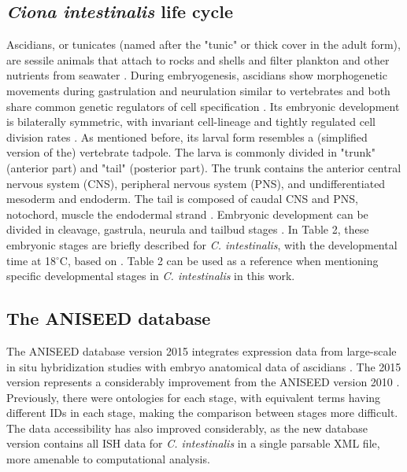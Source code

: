 \subsection{\textit{Ciona intestinalis} life cycle}


Ascidians, or tunicates (named after the "tunic" or thick cover in the adult form), are sessile animals that  attach to rocks and shells and filter plankton and other nutrients from seawater \citep{satoh2014developmental}.
During embryogenesis, ascidians show morphogenetic movements during gastrulation and neurulation similar to vertebrates and both share common genetic regulators of cell specification \citep{Satoh2003}. Its embryonic development is bilaterally symmetric, with invariant cell-lineage and tightly regulated cell division rates \citep{Stolfi2015}.
%
As mentioned before, its larval form resembles a (simplified version of the) vertebrate tadpole. The larva is commonly divided in "trunk" (anterior part) and "tail" (posterior part). The trunk contains the anterior central nervous system (CNS), peripheral nervous system (PNS), and undifferentiated mesoderm and endoderm. 
The tail is composed of caudal CNS and PNS, notochord, muscle the endodermal strand \citep{Stolfi2015}.
Embryonic development can be divided in cleavage, gastrula, neurula and tailbud stages \citep{Hotta2007}. In Table 2, these embryonic stages are briefly described for \textit{C. intestinalis}, with the developmental time at 18$^\circ$C, based on \citep{Hotta2007}. Table 2 can be used as a reference when mentioning specific developmental stages in \textit{C. intestinalis} in this work.


\subsection{The ANISEED database}

The ANISEED database version 2015 integrates expression data from large-scale in situ hybridization studies with embryo anatomical data of ascidians \citep{Brozovic2016}. The 2015 version represents a considerably improvement from the ANISEED version 2010 \citep{Tassy2010}. Previously, there were ontologies for each stage, with equivalent terms having different IDs in each stage, making the comparison between stages more difficult. The data accessibility has also improved considerably, as the new database version contains all ISH data for \textit{C. intestinalis} in a single parsable XML file, more amenable to computational analysis.

